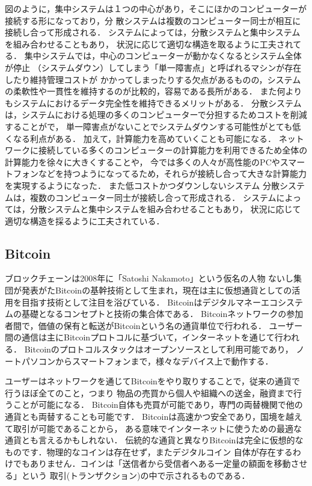 \documentclass[a4paper,12pt]{jsarticle}
\begin{document}
図のように，集中システムは１つの中心があり，そこにほかのコンピューターが接続する形になっており，分
散システムは複数のコンピューター同士が相互に接続し合って形成される．
システムによっては，分散システムと集中システムを組み合わせることもあり，
状況に応じて適切な構造を取るように工夫されてる．
集中システムでは，中心のコンピューターが動かなくなるとシステム全体が停止
（システムダウン）してしまう「単一障害点」と呼ばれるマシンが存在したり維持管理コストが
かかってしまったりする欠点があるものの，システムの柔軟性や一貫性を維持するのが比較的，容易である長所がある．
また何よりもシステムにおけるデータ完全性を維持できるメリットがある．
分散システムは，システムにおける処理の多くのコンピューターで分担するためコストを削減することがで，
単一障害点がないことでシステムダウンする可能性がとても低くなる利点がある．
加えて，計算能力を高めていくことも可能になる．
ネットワークに接続している多くのコンピューターの計算能力を利用できるため全体の計算能力を徐々に大きくすることや，
今では多くの人々が高性能のPCやスマートフォンなどを持つようになってるため，それらが接続し合って大きな計算能力を実現するようになった．
また低コストかつダウンしないシステム
分散システムは，複数のコンピューター同士が接続し合って形成される．
システムによっては，分散システムと集中システムを組み合わせることもあり，
状況に応じて適切な構造を採るように工夫されている．


\subsection{Bitcoin}
ブロックチェーンは2008年に「Satoshi Nakamoto」という仮名の人物
ないし集団が発表がたBitcoinの基幹技術として生まれ，現在は主に仮想通貨としての活用を目指す技術として注目を浴びている．
Bitcoinはデジタルマネーエコシステムの基礎となるコンセプトと技術の集合体である．
Bitcoinネットワークの参加者間で，価値の保有と転送がBitcoinという名の通貨単位で行われる．
ユーザー間の通信は主にBitcoinプロトコルに基づいて，インターネットを通じて行われる．
Bitcoinのプロトコルスタックはオープンソースとして利用可能であり，
ノートパソコンからスマートフォンまで，様々なデバイス上で動作する．

ユーザーはネットワークを通じてBitcoinをやり取りすることで，従来の通貨で行うほぼ全てのこと，つまり
物品の売買から個人や組織への送金，融資まで行うことが可能になる．
Bitcoin自体も売買が可能であり，専門の両替機関で他の通貨とも両替することも可能です．
Bitcoinは高速かつ安全であり，国境を越えて取引が可能であることから，
ある意味でインターネットに使うための最適な通貨とも言えるかもしれない．
伝統的な通貨と異なりBitcoinは完全に仮想的なものです．物理的なコインは存在せず，またデジタルコイン
自体が存在するわけでもありません．コインは「送信者から受信者へある一定量の額面を移動させる」という
取引(トランザクション)の中で示されるものである．
\end{document}
